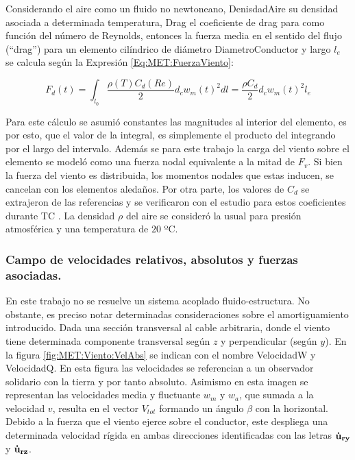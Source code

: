 Considerando el aire como un fluido no newtoneano, \gls{DenisdadAire} su densidad asociada a determinada temperatura, \gls{Drag} el coeficiente de drag para como función del número de Reynolds, entonces la fuerza media en el sentido del flujo (``drag'') para un elemento cilíndrico de diámetro \gls{DiametroConductor} y largo $l_e$ se calcula según la Expresión \eqref{Eq:MET:FuerzaViento}:


\begin{equation}
	\label{Eq:MET:FuerzaViento}
	F_d(t)=\int_{l_0}\frac{\rho (T)C_d(Re)}{2}{d_c w_m(t)^2} dl= \frac{\rho C_d}{2}d_c w_m(t)^2l_{e}
\end{equation}

Para este cálculo se asumió constantes las magnitudes al interior del elemento, es por esto, que el valor de la integral, es simplemente el producto del integrando por el largo del intervalo. Además se para este trabajo la carga del viento sobre el elemento se modeló como una fuerza nodal equivalente a la mitad de $F_v$. Si bien la fuerza del viento es distribuida, los momentos nodales que estas inducen, se cancelan con los elementos aledaños. Por otra parte, los valores de $C_d$ se extrajeron de las referencias \citep{Foti2016} y se verificaron con el estudio para estos coeficientes durante TC \citep{mara2007effects}. La densidad $\rho$ del aire se consideró la usual para presión atmosférica y una temperatura de $20$ ºC.

\subsubsection{Campo de velocidades relativos, absolutos y fuerzas asociadas.}\label{SubSec:MET:CampoVelRealt}
En este trabajo no se resuelve un sistema acoplado fluido-estructura. No obstante, es preciso notar determinadas consideraciones sobre el amortiguamiento introducido. Dada una sección  transversal al cable arbitraria, donde el viento tiene determinada componente transversal según $z$ y perpendicular (según $y$). En la figura \ref{fig:MET:Viento:VelAbs} se indican con el nombre \gls{VelocidadW} y \gls{VelocidadQ}. En esta figura las velocidades se referencian a un observador solidario con la tierra y por tanto  absoluto. Asimismo en esta imagen se representan las velocidades media y fluctuante $w_m$ y $w_a$, que sumada a la velocidad $v$, resulta en el vector $V_{tot}$ formando un ángulo $\beta$ con la horizontal. Debido a la fuerza que el viento ejerce sobre el conductor, este despliega una determinada velocidad rígida en ambas direcciones identificadas con las letras $\bf{\dot{u}}_{ry}$ y $\bf{\dot{u}}_{rz}$. 
% 

